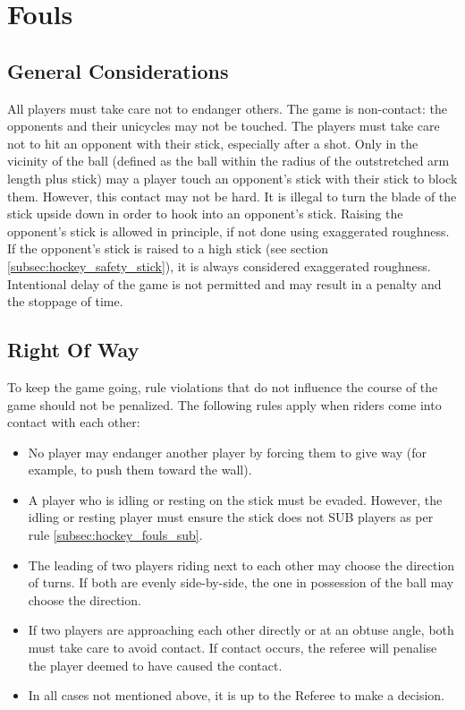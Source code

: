 \section{Fouls}

\subsection{General Considerations}
All players must take care not to endanger others.
The game is non-contact: the opponents and their unicycles may not be touched.
The players must take care not to hit an opponent with their stick, especially after a shot.
Only in the vicinity of the ball (defined as the ball within the radius of the outstretched arm length plus stick) may a player touch an opponent's stick with their stick to block them.
However, this contact may not be hard.
It is illegal to turn the blade of the stick upside down in order to hook into an opponent's stick.
Raising the opponent's stick is allowed in principle, if not done using exaggerated roughness.
If the opponent's stick is raised to a high stick (see section \ref{subsec:hockey_safety_stick}), it is always considered exaggerated roughness.
Intentional delay of the game is not permitted and may result in a penalty and the stoppage of time.

\subsection{Right Of Way}
To keep the game going, rule violations that do not influence the course of the game should not be penalized.
The following rules apply when riders come into contact with each other:
\begin{itemize}
\item No player may endanger another player by forcing them to give way (for example, to push them toward the wall).
\item A player who is idling or resting on the stick must be evaded.
  However, the idling or resting player must ensure the stick does not SUB players as per rule \ref{subsec:hockey_fouls_sub}.
\item The leading of two players riding next to each other may choose the direction of turns.
If both are evenly side-by-side, the one in possession of the ball may choose the direction.
\item If two players are approaching each other directly or at an obtuse angle, both must take care to avoid contact.
  If contact occurs, the referee will penalise the player deemed to have caused the contact.
\item In all cases not mentioned above, it is up to the Referee to make a decision.
\end{itemize}

